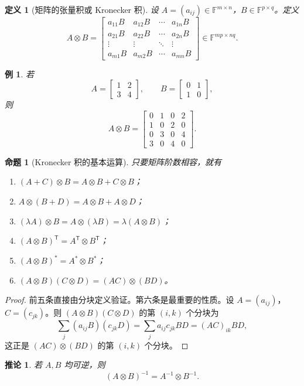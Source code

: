 \documentclass[UTF8,openany,zihao=-4]{ctexbook}
\theoremstyle{cnplain}
\newtheorem{definition}{定义}[chapter]
\newtheorem{proposition}{命题}[chapter]
\newtheorem{corollary}{推论}[chapter]
\newtheorem{example}{例}[chapter]
\newcommand{\F}{\mathbb F}
\newcommand{\mat}[1]{\begin{bmatrix}#1\end{bmatrix}}
\begin{document}
\begin{definition}[矩阵的张量积或 Kronecker 积]
设 $A=(a_{ij})\in\F^{m\times n}$，$B\in\F^{p\times q}$。定义
\[
A\otimes B=
\begin{bmatrix}
a_{11}B&a_{12}B&\cdots&a_{1n}B\\
a_{21}B&a_{22}B&\cdots&a_{2n}B\\
\vdots&\vdots&\ddots&\vdots\\
a_{m1}B&a_{m2}B&\cdots&a_{mn}B
\end{bmatrix}
\in\F^{mp\times nq}.
\]
\end{definition}

\begin{example}
若
\[
A=\mat{1&2\\3&4},
\qquad
B=\mat{0&1\\1&0},
\]
则
\[
A\otimes B=
\mat{
0&1&0&2\\
1&0&2&0\\
0&3&0&4\\
3&0&4&0
}.
\]
\end{example}

\begin{proposition}[Kronecker 积的基本运算]
只要矩阵阶数相容，就有
\begin{enumerate}
  \item $(A+C)\otimes B=A\otimes B+C\otimes B$；
  \item $A\otimes(B+D)=A\otimes B+A\otimes D$；
  \item $(\lambda A)\otimes B=A\otimes(\lambda B)=\lambda(A\otimes B)$；
  \item $(A\otimes B)^{\mathsf T}=A^{\mathsf T}\otimes B^{\mathsf T}$；
  \item $(A\otimes B)^*=A^*\otimes B^*$；
  \item $(A\otimes B)(C\otimes D)=(AC)\otimes(BD)$。
\end{enumerate}
\end{proposition}

\begin{proof}
前五条直接由分块定义验证。第六条是最重要的性质。设 $A=(a_{ij})$，$C=(c_{jk})$。则 $(A\otimes B)(C\otimes D)$ 的第 $(i,k)$ 个分块为
\[
\sum_j (a_{ij}B)(c_{jk}D)=\sum_j a_{ij}c_{jk}BD=(AC)_{ik}BD,
\]
这正是 $(AC)\otimes(BD)$ 的第 $(i,k)$ 个分块。
\end{proof}

\begin{corollary}
若 $A,B$ 均可逆，则
\[
(A\otimes B)^{-1}=A^{-1}\otimes B^{-1}.
\]
\end{corollary}
\end{document}
